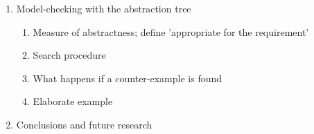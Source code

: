 \begin{enumerate}
	\item Model-checking with the abstraction tree
	\begin{enumerate}
		\item Measure of abstractness; define 'appropriate for the requirement'
		\item Search procedure
		\item What happens if a counter-example is found
		\item Elaborate example
	\end{enumerate}
	
	\item Conclusions and future research
	
\end{enumerate}



